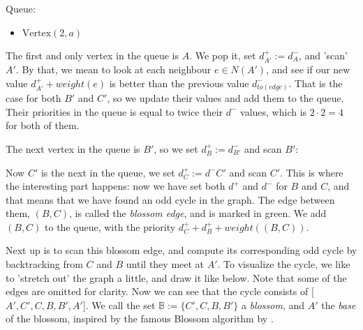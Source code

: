 \begin{minipage}{.75\linewidth}
\end{minipage}\hfill%
\begin{minipage}{.22\linewidth}
    Queue:
    \begin{itemize}
        \item $\text{Vertex}(2, a)$
    \end{itemize}
\end{minipage}



The first and only vertex in the queue is $A$. We pop it, set $d^+_{A'} := d^-_A$, and 'scan' $A'$. By that, we mean to look at each neighbour $e \in N(A')$, and see if our new value $d^+_{A'} + weight(e)$ is better than the previous value $d^-_{to(edge)}$. That is the case for both $B'$ and $C'$, so we update their values and add them to the queue. Their priorities in the queue is equal to twice their $d^-$ values, which is $2 \cdot 2 = 4$ for both of them.



The next vertex in the queue is $B'$, so we set $d^+_B := d^-_{B'}$ and scan $B'$:



Now $C'$ is the next in the queue, we set $d^+_C := d^-{C'}$ and scan $C'$. This is where the interesting part happens: now we have set both $d^+$ and $d^-$ for $B$ and $C$, and that means that we have found an odd cycle in the graph. The edge between them, $(B,C)$, is called the \emph{blossom edge}, and is marked in green. We add $(B,C)$ to the queue, with the priority $d^+_C + d^+_B + weight((B,C))$.



Next up is to scan this blossom edge, and compute its corresponding odd cycle by backtracking from $C$ and $B$ until they meet at $A'$. To visualize the cycle, we like to 'stretch out' the graph a little, and draw it like below. Note that some of the edges are omitted for clarity. Now we can see that the cycle consists of [$A',C',C,B,B',A'$]. We call the set $\mathbb{B} := \{C',C,B,B'\}$ a \emph{blossom}, and $A'$ the \emph{base} of the blossom, inspired by the famous Blossom algorithm by \cite{source:blossom}.

